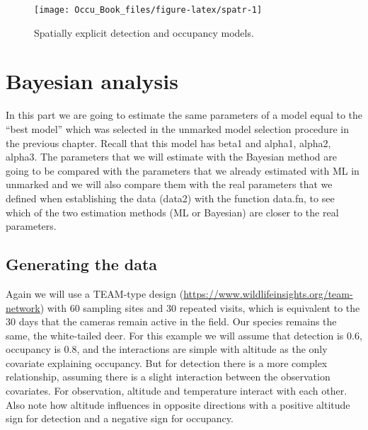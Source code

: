 \documentclass[
]{book}
\newenvironment{Shaded}{\begin{snugshade}}{\end{snugshade}}
\newcommand{\CommentTok}[1]{\textcolor[rgb]{0.56,0.35,0.01}{\textit{#1}}}
\newcommand{\FunctionTok}[1]{\textcolor[rgb]{0.00,0.00,0.00}{#1}}
\newcommand{\NormalTok}[1]{#1}
\newcommand{\OtherTok}[1]{\textcolor[rgb]{0.56,0.35,0.01}{#1}}
\newcommand{\SpecialCharTok}[1]{\textcolor[rgb]{0.00,0.00,0.00}{#1}}
\newcommand{\StringTok}[1]{\textcolor[rgb]{0.31,0.60,0.02}{#1}}
\begin{document}
\begin{Shaded}
\end{Shaded}

\begin{figure}
\texttt{[image: Occu\_Book\_files/figure-latex/spatr-1]} \caption[fig.]{Spatially explicit detection and occupancy models.}\label{fig:spatr}
\end{figure}

\hypertarget{bayesian}{%
\chapter{Bayesian analysis}\label{bayesian}}

In this part we are going to estimate the same parameters of a model equal to the ``best model'' which was selected in the unmarked model selection procedure in the previous chapter. Recall that this model has beta1 and alpha1, alpha2, alpha3. The parameters that we will estimate with the Bayesian method are going to be compared with the parameters that we already estimated with ML in unmarked and we will also compare them with the real parameters that we defined when establishing the data (data2) with the function data.fn, to see which of the two estimation methods (ML or Bayesian) are closer to the real parameters.

\hypertarget{generating-the-data-1}{%
\section{Generating the data}\label{generating-the-data-1}}

Again we will use a TEAM-type design (\url{https://www.wildlifeinsights.org/team-network}) with 60 sampling sites and 30 repeated visits, which is equivalent to the 30 days that the cameras remain active in the field. Our species remains the same, the white-tailed deer. For this example we will assume that detection is 0.6, occupancy is 0.8, and the interactions are simple with altitude as the only covariate explaining occupancy. But for detection there is a more complex relationship, assuming there is a slight interaction between the observation covariates. For observation, altitude and temperature interact with each other. Also note how altitude influences in opposite directions with a positive altitude sign for detection and a negative sign for occupancy.
\end{document}
